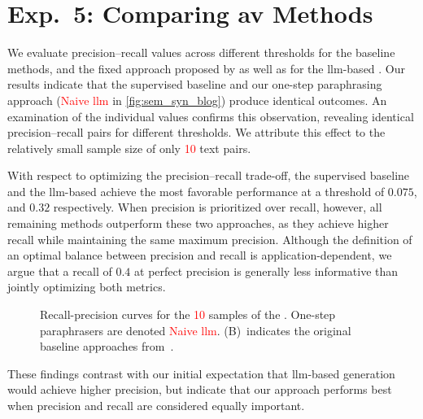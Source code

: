 \section{Exp.\ 5: Comparing \acs{av} Methods}%
\label{subsec:imp_gen_res}

We evaluate precision–recall values across different thresholds for the baseline methods, and the fixed approach proposed by \citet{koppel_determining_2014} as well as for the \ac{llm}-based \impAppr{}.
Our results indicate that the supervised baseline and our one-step paraphrasing approach (\textcolor{red}{Naive \ac{llm}} in \autoref{fig:sem_syn_blog}) produce identical outcomes.
An examination of the individual values confirms this observation, revealing identical precision–recall pairs for different thresholds.
We attribute this effect to the relatively small sample size of only \textcolor{red}{10} text pairs.

With respect to optimizing the precision–recall trade-off, the supervised baseline and the \ac{llm}-based \impAppr{} achieve the most favorable performance at a threshold of $0.075$, and $0.32$ respectively.
When precision is prioritized over recall, however, all remaining methods outperform these two approaches, as they achieve higher recall while maintaining the same maximum precision.
Although the definition of an optimal balance between precision and recall is application-dependent, we argue that a recall of $0.4$ at perfect precision is generally less informative than jointly optimizing both metrics.

\begin{figure}[htbp]
    \centering
    
    \caption[Recall-precision curves for the \dataStudent{}.]{Recall-precision curves for the \textcolor{red}{10} samples of the \dataStudent{}. 
    One-step paraphrasers are denoted \textcolor{red}{Naive \ac{llm}}.
    (B)~indicates the original baseline approaches from~\citep{koppel_determining_2014}.
    }
    \label{fig:sem_syn_blog}
\end{figure}

These findings contrast with our initial expectation that \ac{llm}-based \imp{} generation would achieve higher precision, but indicate that our approach performs best when precision and recall are considered equally important.
